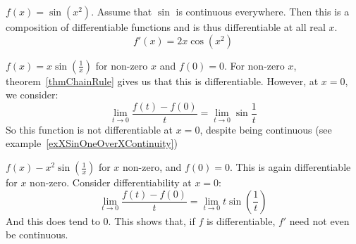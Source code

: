 \documentclass[../Main.tex]{subfiles}
\begin{document}
\begin{examples}{}
    \item $f(x) = \sin{(x^2)}$. Assume that $\sin$ is continuous everywhere. Then this is a composition of differentiable functions and is thus differentiable at all real $x$.
        \begin{equation*}
            f'(x) = 2x\cos{(x^2)}
        \end{equation*}
    \item $f(x) = x\sin{\left(\frac{1}{x}\right)}$ for non-zero $x$ and $f(0) = 0$. For non-zero $x$, theorem~\ref{thmChainRule} gives us that this is differentiable. However, at $x = 0$, we consider:
        \begin{equation*}
            \lim_{t \to 0} \frac{f(t) - f(0)}{t} = \lim_{t \to 0} \sin{\frac{1}{t}}
        \end{equation*}
        So this function is not differentiable at $x = 0$, despite being continuous (see example~\ref{exXSinOneOverXContinuity})
    \item $f(x) - x^2 \sin{\left(\frac{1}{x}\right)}$ for $x$ non-zero, and $f(0) = 0$. This is again differentiable for $x$ non-zero. Consider differentiability at $x = 0$:
        \begin{equation*}
            \lim_{t \to 0} \frac{f(t) - f(0)}{t} = \lim_{t \to 0}  t \sin{\left(\frac{1}{t}\right)}
        \end{equation*}
        And this does tend to 0. This shows that, if $f$ is differentiable, $f'$ need not even be continuous.
\end{examples}
\end{document}
